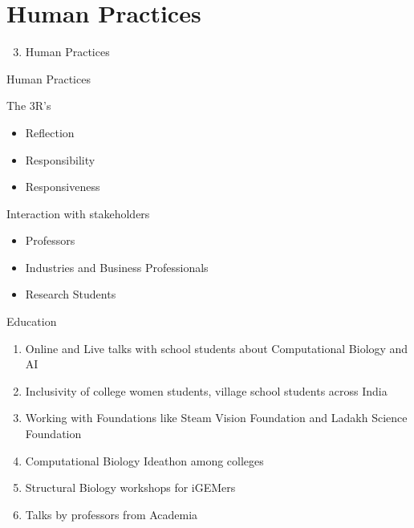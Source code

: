 \section*{Human Practices}

\begin{frame}
    \begin{enumerate}
        \setcounter{enumi}{2}
        \item Human Practices
    \end{enumerate}
\end{frame}

\begin{frame}{Human Practices}
    \begin{block}{The 3R's}
        \begin{itemize}
            \item Reflection
            \item Responsibility
            \item Responsiveness
        \end{itemize}
    \end{block}

    \begin{block}{Interaction with stakeholders}
        \begin{itemize}
            \item Professors
            \item Industries and Business Professionals
            \item Research Students
    
        \end{itemize}
    \end{block}
\end{frame}

\begin{frame}{Education}
    \begin{enumerate}
        \item Online and Live talks with school students about Computational Biology and AI
        \item Inclusivity of college women students, village school students across India
        \item Working with Foundations like Steam Vision Foundation and Ladakh Science Foundation
        \item Computational Biology Ideathon among colleges
        \item Structural Biology workshops for iGEMers
        \item Talks by professors from Academia
    \end{enumerate}    
\end{frame}


